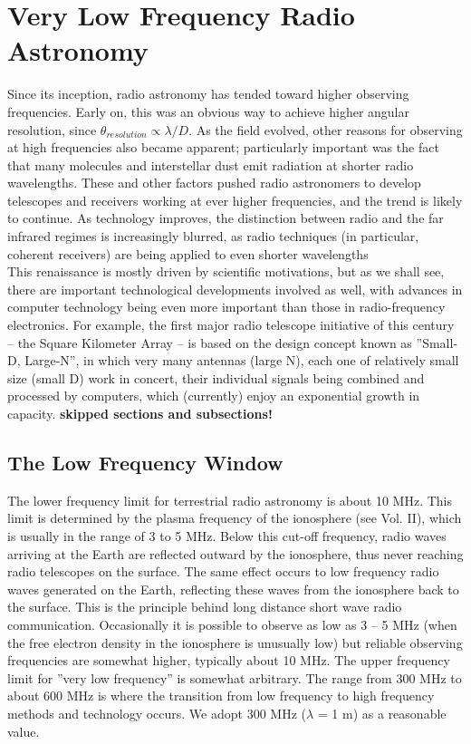 \documentclass[10pt]{report}
\begin{document}
\section{Very Low Frequency Radio Astronomy}
Since its inception, radio astronomy has tended toward higher observing frequencies.  Early on, this was an obvious way to achieve higher angular resolution, since $\theta_{resolution} \propto \lambda/D$.  As the field evolved, other reasons for observing at high frequencies also became apparent; particularly important was the fact that many molecules and interstellar dust emit radiation at shorter radio wavelengths.  These and other factors pushed radio astronomers to develop telescopes and receivers working at ever higher frequencies, and the trend is likely to continue.  As technology improves, the distinction between radio and the far infrared regimes is increasingly blurred, as radio techniques (in particular, coherent receivers) are being applied to even shorter wavelengths\\
This renaissance is mostly driven by scientific motivations, but as we shall see, there are important technological developments involved as well, with advances in computer technology being even more important than those in radio-frequency electronics.  For example, the first major radio telescope initiative of this century – the Square Kilometer Array – is based on the design concept known as ''Small-D, Large-N'', in which very many antennas (large N), each one of relatively small size (small D) work in concert, their individual signals being combined and processed by computers, which (currently) enjoy an exponential growth in capacity.
\textbf{skipped sections and subsections!}
\subsection{The Low Frequency Window}
The lower frequency limit for terrestrial radio astronomy is about 10 MHz.  This limit is determined by the plasma frequency of the ionosphere (see Vol. II), which is usually in the range of 3 to 5 MHz.  Below this cut-off frequency, radio waves arriving at the Earth are reflected outward by the ionosphere, thus never reaching radio telescopes on the surface.  The same effect occurs to low frequency radio waves generated on the Earth, reflecting these waves from the ionosphere back to the surface.  This is the principle behind long distance short wave radio communication.  Occasionally it is possible to observe as low as 3 – 5 MHz (when the free electron density in the ionosphere is unusually low) but reliable observing frequencies are somewhat higher, typically about 10 MHz.  The upper frequency limit for ''very low frequency'' is somewhat arbitrary.  The range from 300 MHz to about 600 MHz is where the transition from low frequency to high frequency methods and technology occurs.  We adopt 300 MHz ($\lambda$ = 1 m) as a reasonable value. 
\end{document}
